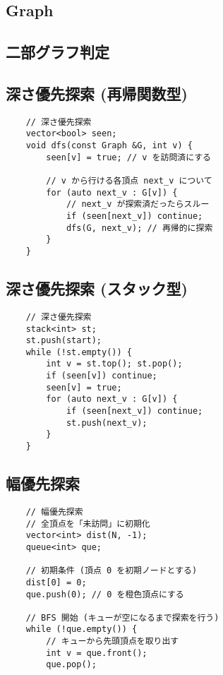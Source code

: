\documentclass[a4paper, landscape, 9pt]{jarticle} %
\begin{document}
\begin{multicols*}{3}
    \section{Graph}

    \subsection{二部グラフ判定}

    \subsection{深さ優先探索 (再帰関数型)}
    \begin{lstlisting}
    // 深さ優先探索
    vector<bool> seen;
    void dfs(const Graph &G, int v) {
        seen[v] = true; // v を訪問済にする
    
        // v から行ける各頂点 next_v について
        for (auto next_v : G[v]) { 
            // next_v が探索済だったらスルー
            if (seen[next_v]) continue;
            dfs(G, next_v); // 再帰的に探索
        }
    }
    \end{lstlisting}

    \subsection{深さ優先探索 (スタック型)}
    \begin{lstlisting}
    // 深さ優先探索
    stack<int> st;
    st.push(start);
    while (!st.empty()) {
        int v = st.top(); st.pop();
        if (seen[v]) continue;
        seen[v] = true;
        for (auto next_v : G[v]) {
            if (seen[next_v]) continue;
            st.push(next_v);
        }
    }
    \end{lstlisting}

    \subsection{幅優先探索}
    \begin{lstlisting}
    // 幅優先探索
    // 全頂点を「未訪問」に初期化
    vector<int> dist(N, -1); 
    queue<int> que;

    // 初期条件 (頂点 0 を初期ノードとする)
    dist[0] = 0;
    que.push(0); // 0 を橙色頂点にする

    // BFS 開始 (キューが空になるまで探索を行う)
    while (!que.empty()) {
        // キューから先頭頂点を取り出す
        int v = que.front(); 
        que.pop();


\end{lstlisting}
\end{multicols*}
\end{document}
